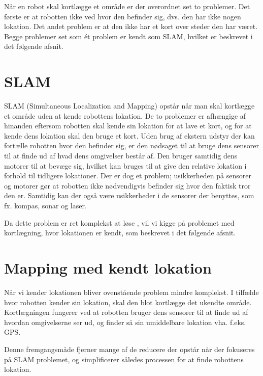 Når en robot skal kortlægge et område er der overordnet set to problemer. 
Det første er at robotten ikke ved hvor den befinder sig, dvs. den har ikke nogen lokation.
Det andet problem er at den ikke har et kort over steder den har været.
Begge problemer set som ét problem er kendt som SLAM, hvilket er beskrevet i det følgende afsnit.

\section*{SLAM}\label{SLAM}
SLAM (Simultaneous Localization and Mapping) opstår når man skal kortlægge et område uden at kende robottens lokation.
De to problemer er afhængige af hinanden eftersom robotten skal kende sin lokation for at lave et kort, og for at kende dens lokation skal den bruge et kort.
Uden brug af ekstern udstyr der kan fortælle robotten hvor den befinder sig, er den nødsaget til at bruge dens sensorer til at finde ud af hvad dens omgivelser består af.
Den bruger samtidig dens motorer til at bevæge sig, hvilket kan bruges til at give den relative lokation i forhold til tidligere lokationer.
Der er dog et problem; usikkerheden på sensorer og motorer gør at robotten ikke nødvendigvis befinder sig hvor den faktisk tror den er.
Samtidig kan der også være usikkerheder i de sensorer der benyttes, som fx. kompas, sonar og laser.

Da dette problem er ret komplekst at løse \cite[s.~514]{thrun2002particle}, vil vi kigge på problemet med kortlægning, hvor lokationen er kendt, som beskrevet i det følgende afsnit.

\section*{Mapping med kendt lokation}\label{map_lok}
Når vi kender lokationen bliver ovenstående problem mindre komplekst.
I tilfælde hvor robotten kender sin lokation, skal den blot kortlægge det ukendte område.
Kortlægningen fungerer ved at robotten bruger dens sensorer til at finde ud af hvordan omgivelserne ser ud, og finder så sin umiddelbare lokation vha. f.eks. GPS.

Denne fremgangsmåde fjerner mange af de reducere der opstår når der fokuseres på SLAM problemet, og simplificerer således processen for at finde robottens lokation.